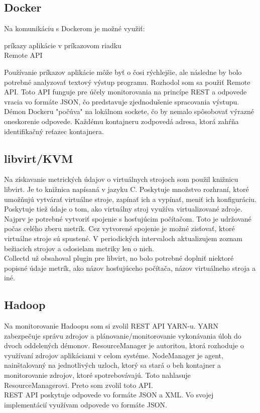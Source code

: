 \documentclass[11pt,final,oneside]{fithesis}
\begin{document}
\subsection{Docker}
Na komunikáciu s Dockerom je možné využiť:
\begin{description}
\item[príkazy aplikácie v príkazovom riadku]
\item[Remote API]
\end{description}

Používanie príkazov aplikácie môže byť o čosi rýchlejšie, ale následne by bolo potrebné analyzovať textový výstup programu.
Rozhodol som sa použiť Remote API. Toto API funguje pre účely monitorovania na princípe REST a odpovede vracia vo formáte JSON, čo predstavuje zjednodušenie spracovania výstupu. Démon Dockeru "počúva" na 
lokálnom sockete, čo by nemalo spôsobovať výrazné oneskorenie odpovede. Každému kontajneru zodpovedá adresa, ktorá zahŕňa identifikačný reťazec kontajnera.

\subsection{libvirt/KVM}
Na získavanie metrických údajov o virtuálnych strojoch som použil knižnicu libvirt. Je to knižnica napísaná v jazyku C. Poskytuje množstvo
rozhraní, ktoré umožňujú vytvárať virtuálne stroje, zapínať ich a vypínať, meniť ich konfiguráciu. Poskytuje tiež údaje o tom, ako virtuálny
stroj využíva virtualizované zdroje. 
\\Najprv je potrebné vytvoriť spojenie s hosťujúcim počítačom. Toto je udržované počas celého zberu metrík. Cez vytvorené spojenie
je možné zisťovať, ktoré virtuálne stroje sú spustené. V periodických intervaloch aktualizujem zoznam bežiacich strojov a odosielam
metriky len o nich.
\\Collectd už obsahoval plugin pre libvirt, no bolo potrebné doplniť niektoré popisné údaje metrík, ako názov hosťujúceho počítača,
názov virtuálneho stroja a iné.

\subsection{Hadoop}
Na monitorovanie Hadoopu som si zvolil REST API YARN-u. YARN zabezpečuje správu zdrojov a plánovanie/monitorovanie vykonávania úloh do dvoch
oddelených démonov.\cite{23} ResourceManager je autoritou, ktorá rozhoduje o využívaní zdrojov aplikáciami v celom systéme. NodeManager
je agent, nainštalovaný na jednotlivých uzloch, ktorý sa stará o beh kontajner a monitorovanie zdrojov, ktoré spotrebovávajú. Toto
nahlasuje ResourceManagerovi. Preto som zvolil toto API.
\\REST API poskytuje odpovede vo formáte JSON a XML. Vo svojej implementácií využívam odpovede vo formáte JSON.
\end{document}
